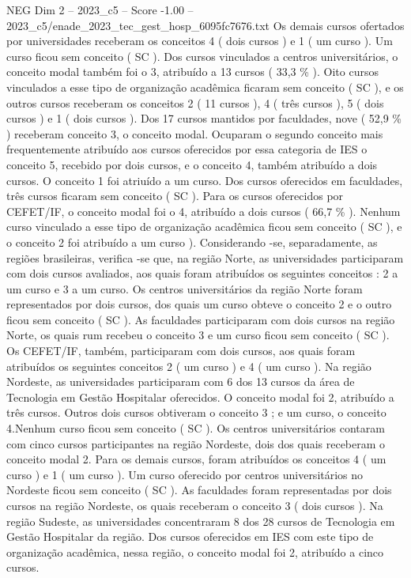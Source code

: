 \begin{textsample}{NEG Dim 2 – 2023\_c5 – Score -1.00 – 2023\_c5/enade\_2023\_tec\_gest\_hosp\_6095fc7676.txt}
Os demais cursos ofertados por universidades receberam os conceitos 4 ( dois cursos ) e 1 ( um curso ).
Um curso ficou sem conceito ( SC ).
Dos cursos vinculados a centros universitários, o conceito modal também foi o 3, atribuído a 13 cursos ( 33,3 \% ).
Oito cursos vinculados a esse tipo de organização acadêmica ficaram sem conceito ( SC ), e os outros cursos receberam os conceitos 2 ( 11 cursos ), 4 ( três cursos ), 5 ( dois cursos ) e 1 ( dois cursos ).
Dos 17 cursos mantidos por faculdades, nove ( 52,9 \% ) receberam conceito 3, o conceito modal.
Ocuparam o segundo conceito mais frequentemente atribuído aos cursos oferecidos por essa categoria de IES o conceito 5, recebido por dois cursos, e o conceito 4, também atribuído a dois cursos.
O conceito 1 foi atriuído a um curso.
Dos cursos oferecidos em faculdades, três cursos ficaram sem conceito ( SC ).
Para os cursos oferecidos por CEFET/IF, o conceito modal foi o 4, atribuído a dois cursos ( 66,7 \% ).
Nenhum curso vinculado a esse tipo de organização acadêmica ficou sem conceito ( SC ), e o conceito 2 foi atribuído a um curso ).
Considerando -se, separadamente, as regiões brasileiras, verifica -se que, na região Norte, as universidades participaram com dois cursos avaliados, aos quais foram atribuídos os seguintes conceitos : 2 a um curso e 3 a um curso.
Os centros universitários da região Norte foram representados por dois cursos, dos quais um curso obteve o conceito 2 e o outro ficou sem conceito ( SC ).
As faculdades participaram com dois cursos na região Norte, os quais rum recebeu o conceito 3 e um curso ficou sem conceito ( SC ).
Os CEFET/IF, também, participaram com dois cursos, aos quais foram atribuídos os seguintes conceitos 2 ( um curso ) e 4 ( um curso ).
Na região Nordeste, as universidades participaram com 6 dos 13 cursos da área de Tecnologia em Gestão Hospitalar oferecidos.
O conceito modal foi 2, atribuído a três cursos.
Outros dois cursos obtiveram o conceito 3 ; e um curso, o conceito 4.Nenhum curso ficou sem conceito ( SC ).
Os centros universitários contaram com cinco cursos participantes na região Nordeste, dois dos quais receberam o conceito modal 2.
Para os demais cursos, foram atribuídos os conceitos 4 ( um curso ) e 1 ( um curso ).
Um curso oferecido por centros universitários no Nordeste ficou sem conceito ( SC ).
As faculdades foram representadas por dois cursos na região Nordeste, os quais receberam o conceito 3 ( dois cursos ).
Na região Sudeste, as universidades concentraram 8 dos 28 cursos de Tecnologia em Gestão Hospitalar da região.
Dos cursos oferecidos em IES com este tipo de organização acadêmica, nessa região, o conceito modal foi 2, atribuído a cinco cursos.

\end{textsample}
